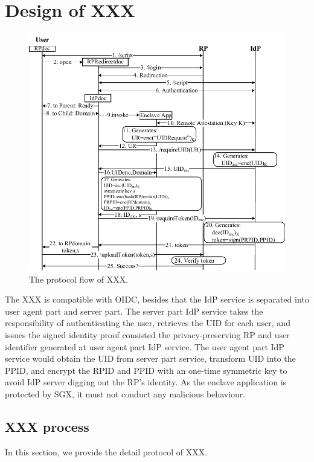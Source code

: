 \section{Design of XXX}
\label{sec:design}
\begin{figure}[t]
  \centering
  \includegraphics[width=\linewidth]{fig/sgx-sso.pdf}
  \caption{The protocol flow of XXX.}
  \label{fig:XXX}
\end{figure}
The XXX is compatible with OIDC, besides that the IdP service is separated into user agent part and server part. 
The server part IdP service takes the responsibility of authenticating the user, retrieves the UID for each user, and issues the signed identity proof consisted the privacy-preserving RP and user identifier generated at user agent part IdP service.
The user agent part IdP service would obtain the UID from server part service, transform UID into the PPID, and encrypt the RPID and PPID with an one-time symmetric key to avoid IdP server digging out the RP's identity. As the enclave application is protected by SGX, it must not conduct any malicious behaviour. 

\subsection{XXX process}
In this section, we provide the detail protocol of XXX.

